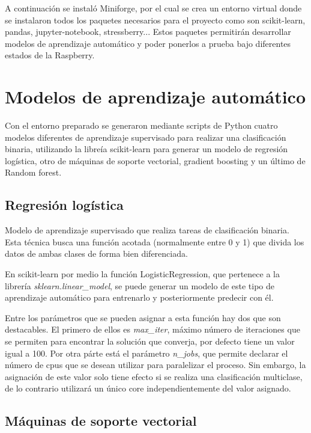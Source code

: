 \documentclass[a4paper, 12pt]{book}
\begin{document}
A continuación se instaló Miniforge, por el cual se crea un entorno virtual donde se instalaron todos los paquetes necesarios para el proyecto como son scikit-learn, pandas, jupyter-notebook, stressberry... Estos paquetes permitirán desarrollar modelos de aprendizaje automático y poder ponerlos a prueba bajo diferentes estados de la Raspberry.

\section{Modelos de aprendizaje automático}

Con el entorno preparado se generaron mediante scripts de Python cuatro modelos diferentes de aprendizaje supervisado para realizar una clasificación binaria, utilizando la libreía scikit-learn para generar un modelo de regresión logística, otro de máquinas de soporte vectorial, gradient boosting y un último de Random forest.

\subsection{Regresión logística}

Modelo de aprendizaje supervisado que realiza tareas de clasificación binaria. Esta técnica busca una función acotada (normalmente entre 0 y 1) que divida los datos de ambas clases de forma bien diferenciada.

En scikit-learn por medio la función LogisticRegression\cite{LogisticRegressionDoc}, que pertenece a la librería \textit{sklearn.linear\_model}, se puede generar un modelo de este tipo de aprendizaje automático para entrenarlo y posteriormente predecir con él. 

Entre los parámetros que se pueden asignar a esta función hay dos que son destacables. El primero de ellos es \textit{max\_iter}, máximo número de iteraciones que se permiten para encontrar la solución que converja, por defecto tiene un valor igual a 100. Por otra párte está el parámetro \textit{n\_jobs}, que permite declarar el número de cpus que se desean utilizar para paralelizar el proceso. Sin embargo, la asignación de este valor solo tiene efecto si se realiza una clasificación multiclase, de lo contrario utilizará un único core independientemente del valor asignado.

\subsection{Máquinas de soporte vectorial}
\end{document}
